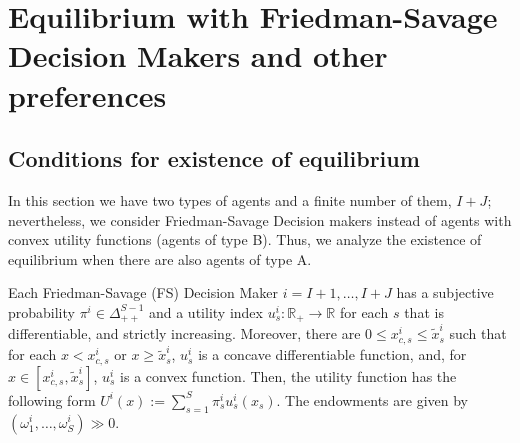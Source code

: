 \documentclass[pdftex]{article}
\numberwithin{equation}{section}
\theoremstyle{th}
\newtheorem{proof lemma}{{Proof Lemma}.}
\theoremstyle{definition}
\newtheorem*{risk lovers}{Risk lovers}
\newtheorem*{risk averse}{Risk averse}
\begin{document}
%
%
%



\section{Equilibrium with Friedman-Savage Decision Makers and other preferences}
\label{sectionfs}
\subsection{Conditions for existence of equilibrium}

In this section we have two types of agents and a finite number of them, $I+J$; nevertheless, we consider Friedman-Savage Decision makers instead of agents with convex utility functions (agents of type B). Thus, we analyze the existence of equilibrium when there are also agents of type A.


{Each Friedman-Savage (FS) Decision Maker $i=I+1,\dots,I+J$ has a subjective probability $\pi^i\in\Delta^{S-1}_{++}$ and a utility index ${u^i_s}:\mathbb{R}_+\rightarrow\mathbb{R}$ for each $s$ that is differentiable, and strictly increasing. Moreover, there are $0\leq{x}^i_{c,s}\leq\tilde{x}^i_s$ such that for each $x<{x^i_{c,s}}$ or $x\geq\tilde{x}^i_s$, ${u^i_s}$ is a concave differentiable function, and, for $x\in\left[x^i_{c,s},\tilde{x}^i_s\right]$, ${u^i_s}$ is a convex function. Then, the utility function has the following form $U^i(x):=\sum_{s=1}^S\pi_s^i{u^i_s}\left(x_s\right)$. The endowments are given by $\left(\omega^i_1,\dots,\omega^i_S\right)\gg0$.}
\end{document}
